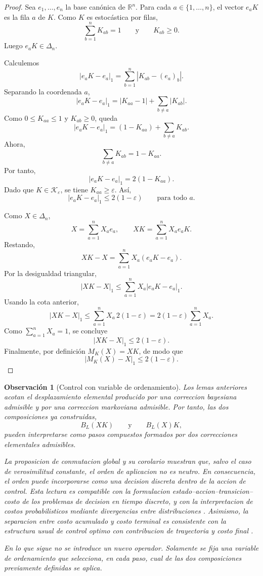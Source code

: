 ﻿\documentclass[12pt]{article}
\newtheorem{observacion}{Observación}[section]
\begin{document}
\begin{proof}
Sea \(e_1,\dots,e_n\) la base canónica de \(\mathbb R^n\). Para cada \(a\in\{1,\dots,n\}\), el vector \(e_aK\) es la fila \(a\) de \(K\). Como \(K\) es estocástica por filas,
\[
\sum_{b=1}^n K_{ab}=1
\qquad\text{y}\qquad
K_{ab}\ge0.
\]
Luego \(e_aK\in\Delta_n\).

Calculemos
\[
\left|e_aK-e_a\right|_1
=
\sum_{b=1}^n |K_{ab}-(e_a)_b|.
\]
Separando la coordenada \(a\),
\[
\left|e_aK-e_a\right|_1
=
|K_{aa}-1|+\sum_{b\ne a}|K_{ab}|.
\]
Como \(0\le K_{aa}\le1\) y \(K_{ab}\ge0\), queda
\[
\left|e_aK-e_a\right|_1
=
(1-K_{aa})+\sum_{b\ne a}K_{ab}.
\]
Ahora,
\[
\sum_{b\ne a}K_{ab}
=
1-K_{aa}.
\]
Por tanto,
\[
\left|e_aK-e_a\right|_1
=
2(1-K_{aa}).
\]
Dado que \(K\in\mathcal K_\varepsilon\), se tiene \(K_{aa}\ge\varepsilon\). Así,
\[
\left|e_aK-e_a\right|_1
\le
2(1-\varepsilon)
\qquad\text{para todo }a.
\]

Como \(X\in\Delta_n\),
\[
X=\sum_{a=1}^n X_a e_a,
\qquad
XK=\sum_{a=1}^n X_a e_aK.
\]
Restando,
\[
XK-X
=
\sum_{a=1}^n X_a(e_aK-e_a).
\]
Por la desigualdad triangular,
\[
\left|XK-X\right|_1
\le
\sum_{a=1}^n X_a\left|e_aK-e_a\right|_1.
\]
Usando la cota anterior,
\[
\left|XK-X\right|_1
\le
\sum_{a=1}^n X_a\,2(1-\varepsilon)
=
2(1-\varepsilon)\sum_{a=1}^n X_a.
\]
Como \(\sum_{a=1}^n X_a=1\), se concluye
\[
\left|XK-X\right|_1
\le
2(1-\varepsilon).
\]
Finalmente, por definición \(M_K(X)=XK\), de modo que
\[
\left|M_K(X)-X\right|_1
\le
2(1-\varepsilon).
\]
\end{proof}

\begin{observacion}[Control con variable de ordenamiento]
Los lemas anteriores acotan el desplazamiento elemental producido por una correccion bayesiana admisible y por una correccion markoviana admisible. Por tanto, las dos composiciones ya construidas,
\[
B_L(XK)
\qquad\text{y}\qquad
B_L(X)K,
\]
pueden interpretarse como pasos compuestos formados por dos correcciones elementales admisibles.

La proposicion de conmutacion global y su corolario muestran que, salvo el caso de verosimilitud constante, el orden de aplicacion no es neutro. En consecuencia, el orden puede incorporarse como una decision discreta dentro de la accion de control. Esta lectura es compatible con la formulacion estado--accion--transicion--costo de los problemas de decision en tiempo discreto, y con la interpretacion de costos probabilisticos mediante divergencias entre distribuciones \citep{Todorov2009EfficientComputationOptimalActions}. Asimismo, la separacion entre costo acumulado y costo terminal es consistente con la estructura usual de control optimo con contribucion de trayectoria y costo final \citep{Kappen2005LinearTheoryForControlOfNonLinearStochasticSystems}.

En lo que sigue no se introduce un nuevo operador. Solamente se fija una variable de ordenamiento que selecciona, en cada paso, cual de las dos composiciones previamente definidas se aplica.
\end{observacion}
\end{document}

